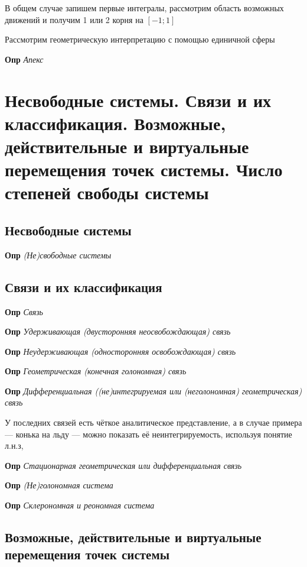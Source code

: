 \documentclass[a4paper, 14pt]{article}
\begin{document}
    В общем случае запишем первые интегралы, рассмотрим область возможных движений и получим 1 или 2 корня на $[-1; 1]$
    
    Рассмотрим геометрическую интерпретацию с помощью единичной сферы
    
    \textbf{Опр} \textit{Апекс}
    
    \section{Несвободные системы.
    Связи и их классификация.
    Возможные, действительные и виртуальные перемещения точек системы.
    Число степеней свободы системы}
    
    \subsection{Несвободные системы}
    
    \textbf{Опр} \textit{(Не)свободные системы}
    
    \subsection{Связи и их классификация}
    
    \textbf{Опр} \textit{Связь}
    
    \textbf{Опр} \textit{Удерживающая (двусторонняя неосвобождающая) связь}
    
    \textbf{Опр} \textit{Неудерживающая (односторонняя освобождающая) связь}
    
    \textbf{Опр} \textit{Геометрическая (конечная голономная) связь}
    
    \textbf{Опр} \textit{Дифференциальная ((не)интегрируемая или (неголономная) геометрическая) связь}
    
    У последних связей есть чёткое аналитическое представление, а в случае примера --- конька на льду --- можно
    показать её неинтегрируемость, используя понятие л.н.з,
    
    \textbf{Опр} \textit{Стационарная геометрическая или дифференциальная связь}
    
    \textbf{Опр} \textit{(Не)голономная система}
    
    \textbf{Опр} \textit{Склерономная и реономная система}
    
    \subsection{Возможные, действительные и виртуальные перемещения точек системы}
    
\end{document}
